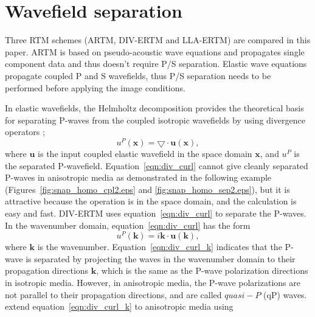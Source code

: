 \documentclass[manuscript,ulem,graphix,revised]{geophysics}
\begin{document}
\section{Wavefield separation} 
\indent\indent
Three RTM schemes (ARTM, DIV-ERTM and LLA-ERTM) are compared in this paper. ARTM is based on pseudo-acoustic wave equations and propagates single component data and thus doesn't require P/S separation.\marginnote{[15]} Elastic wave equations propagate coupled P and S wavefields, thus P/S separation needs to be performed before applying the image conditions. 

In elastic wavefields, the Helmholtz decomposition provides the theoretical basis for separating P-waves from the coupled isotropic wavefields by using divergence operators \citep{aki80};
\begin{equation}
u^{P}(\boldsymbol{x})=\bigtriangledown \cdot \boldsymbol{u}(\boldsymbol{x}),
\label{eqn:div_curl}
\end{equation}
where $\boldsymbol{u}$ is the input coupled elastic wavefield in the space domain $\boldsymbol{x}$, and $u^{P}$ is the separated P-wavefield. 
Equation~\ref{eqn:div_curl} cannot give cleanly separated P-waves in anisotropic media as demonstrated in the following example (Figures~\ref{fig:snap_homo_cpl2.eps} and \ref{fig:snap_homo_sep2.eps}), but it is attractive because the operation is in the space domain, and the calculation is easy and fast. DIV-ERTM uses equation~\ref{eqn:div_curl} to separate the P-waves. In the wavenumber domain, equation~\ref{eqn:div_curl} has the form
\begin{equation}
u^{P}(\boldsymbol{k})=i \boldsymbol{k} \cdot \boldsymbol{u}(\boldsymbol{k}),
\label{eqn:div_curl_k}
\end{equation}
where $\boldsymbol{k}$ is the wavenumber. Equation~\ref{eqn:div_curl_k} indicates that the P-wave is separated by projecting the waves in the wavenumber domain to their propagation directions $\boldsymbol{k}$, which is the same as the P-wave polarization directions in isotropic media. However, in anisotropic media, the P-wave polarizations are not parallel to their propagation directions, and are called $quasi-P$ (qP) waves. \citet{dellinger90} extend equation~\ref{eqn:div_curl_k} to anisotropic media using
\end{document}
